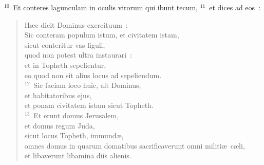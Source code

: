 ${}^{10}$~Et conteres lagunculam in oculis virorum qui ibunt tecum,
${}^{11}$~et dices ad eos~: \begin{flushleft}\begin{verse}H\ae c dicit Dominus exercituum~:\\ Sic conteram populum istum, et civitatem istam,\\ sicut conteritur vas figuli,\\ quod non potest ultra instaurari~:\\ et in Topheth sepelientur,\\ eo quod non sit alius locus ad sepeliendum.\\
${}^{12}$~Sic faciam loco huic, ait Dominus,\\ et habitatoribus ejus,\\ et ponam civitatem istam sicut Topheth.\\
${}^{13}$~Et erunt domus Jerusalem,\\ et domus regum Juda,\\ sicut locus Topheth, immund\ae ,\\ omnes domus in quarum domatibus sacrificaverunt omni militi\ae\ c\ae li,\\ et libaverunt libamina diis alienis.\end{verse}\end{flushleft}


